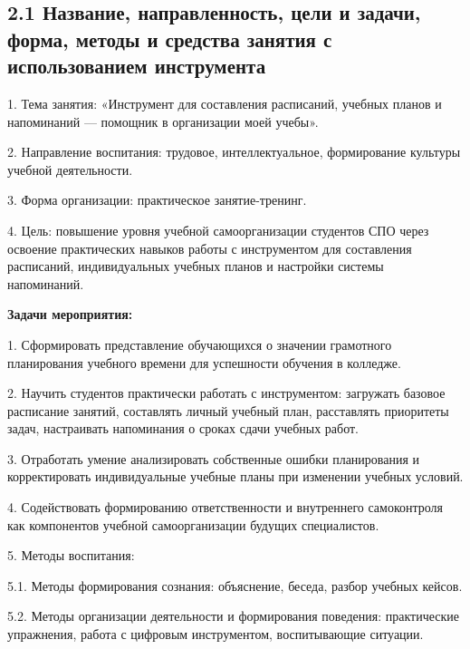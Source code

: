 \documentclass[
]{article}
\begin{document}
\subsection{\texorpdfstring{\textbf{2.1 Название, направленность, цели и
задачи, форма, методы и средства занятия с использованием
инструмента}}{2.1 Название, направленность, цели и задачи, форма, методы и средства занятия с использованием инструмента}}\label{ux43dux430ux437ux432ux430ux43dux438ux435-ux43dux430ux43fux440ux430ux432ux43bux435ux43dux43dux43eux441ux442ux44c-ux446ux435ux43bux438-ux438-ux437ux430ux434ux430ux447ux438-ux444ux43eux440ux43cux430-ux43cux435ux442ux43eux434ux44b-ux438-ux441ux440ux435ux434ux441ux442ux432ux430-ux437ux430ux43dux44fux442ux438ux44f-ux441-ux438ux441ux43fux43eux43bux44cux437ux43eux432ux430ux43dux438ux435ux43c-ux438ux43dux441ux442ux440ux443ux43cux435ux43dux442ux430}

1. Тема занятия: «Инструмент для составления расписаний, учебных планов
и напоминаний --- помощник в организации моей учебы».

2. Направление воспитания: трудовое, интеллектуальное, формирование
культуры учебной деятельности.

3. Форма организации: практическое занятие-тренинг.

4. Цель: повышение уровня учебной самоорганизации студентов СПО через
освоение практических навыков работы с инструментом для составления
расписаний, индивидуальных учебных планов и настройки системы
напоминаний.

\textbf{Задачи мероприятия:}

1. Сформировать представление обучающихся о значении грамотного
планирования учебного времени для успешности обучения в колледже.

2. Научить студентов практически работать с инструментом: загружать
базовое расписание занятий, составлять личный учебный план, расставлять
приоритеты задач, настраивать напоминания о сроках сдачи учебных работ.

3. Отработать умение анализировать собственные ошибки планирования и
корректировать индивидуальные учебные планы при изменении учебных
условий.

4. Содействовать формированию ответственности и внутреннего самоконтроля
как компонентов учебной самоорганизации будущих специалистов.

5. Методы воспитания:

5.1. Методы формирования сознания: объяснение, беседа, разбор учебных
кейсов.

5.2. Методы организации деятельности и формирования поведения:
практические упражнения, работа с цифровым инструментом, воспитывающие
ситуации.
\end{document}
